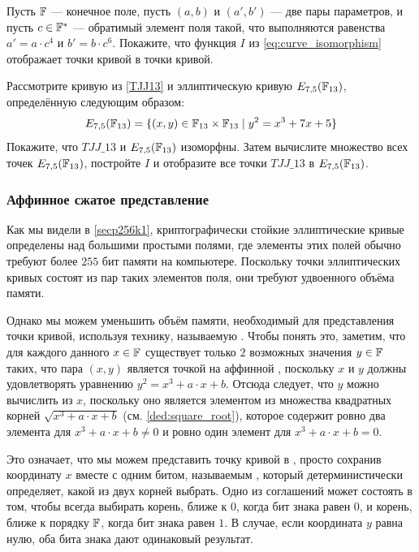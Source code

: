 \begin{exercise}
Пусть $\mathbb{F}$ — конечное поле, пусть $(a,b)$ и $(a',b')$ — две пары параметров, и пусть $c\in \mathbb{F}^*$ — обратимый элемент поля такой, что выполняются равенства $a' = a\cdot c^4$ и $b' = b\cdot c^6$. Покажите, что функция $I$ из \eqref{eq:curve_isomorphism} отображает точки кривой в точки кривой.
\end{exercise}

\begin{exercise}
\label{ex:isomorphic_TJJ13} Рассмотрите кривую  из \examplename{} \ref{TJJ13} и эллиптическую кривую $E_{7,5}(\mathbb{F}_{13})$, определённую следующим образом:
\begin{equation}
E_{7,5}(\mathbb{F}_{13}) = \{ (x,y)\in \mathbb{F}_{13}\times \mathbb{F}_{13}\;|\; y^2 = x^3 + 7x +5\}
\end{equation}
Покажите, что $TJJ\_13$ и $E_{7,5}(\mathbb{F}_{13})$ изоморфны. Затем вычислите множество всех точек $E_{7,5}(\mathbb{F}_{13})$, постройте $I$ и отобразите все точки $TJJ\_13$ в $E_{7,5}(\mathbb{F}_{13})$.
\end{exercise}

\subsubsection{Аффинное сжатое представление}
\label{sec:affine_point_compression}
Как мы видели в \examplename{} \ref{secp256k1}, криптографически стойкие эллиптические кривые определены над большими простыми полями, где элементы этих полей обычно требуют более $255$ бит памяти на компьютере. Поскольку точки эллиптических кривых состоят из пар таких элементов поля, они требуют удвоенного объёма памяти.

Однако мы можем уменьшить объём памяти, необходимый для представления точки кривой, используя технику, называемую . Чтобы понять это, заметим, что для каждого данного $x\in\mathbb{F}$ существует только $2$ возможных значения $y\in \mathbb{F}$ таких, что пара $(x,y)$ является точкой на аффинной , поскольку $x$ и $y$ должны удовлетворять уравнению $y^2 = x^3 + a\cdot x + b$. Отсюда следует, что $y$ можно вычислить из $x$, поскольку оно является элементом из множества квадратных корней $\sqrt{x^3 + a\cdot x +b}$ (см. \ref{ded:square_root}), которое содержит ровно два элемента для $x^3 + a\cdot x +b\neq 0$ и ровно один элемент для $x^3 + a\cdot x +b=0$. 

Это означает, что мы можем представить точку кривой в , просто сохранив координату $x$ вместе с одним битом, называемым , который детерминистически определяет, какой из двух корней выбрать. Одно из соглашений может состоять в том, чтобы всегда выбирать корень, ближе к $0$, когда бит знака равен $0$, и корень, ближе к порядку $\mathbb{F}$, когда бит знака равен $1$. В случае, если координата $y$ равна нулю, оба бита знака дают одинаковый результат.

